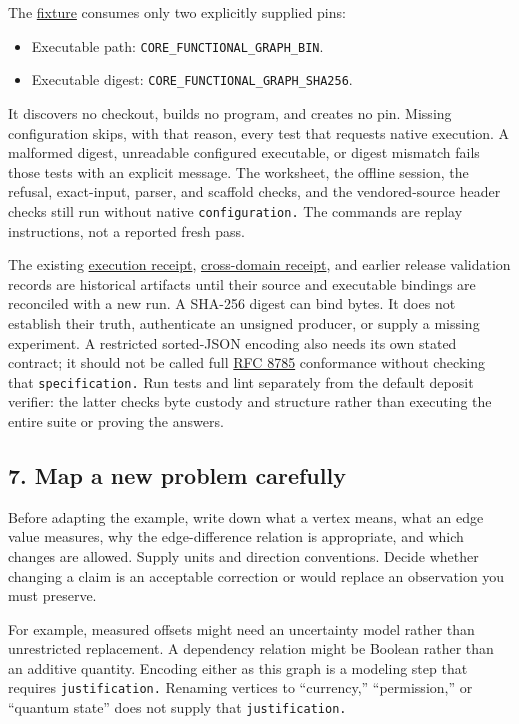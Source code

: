 \documentclass[
  11pt,
]{article}
\providecommand{\tightlist}{%
  \setlength{\itemsep}{0pt}\setlength{\parskip}{0pt}}
\begin{document}
The \href{code/tests/conftest.py}{fixture} consumes only two explicitly
supplied pins:

\begin{itemize}
\tightlist
\item
  Executable path: \nolinkurl{CORE_FUNCTIONAL_GRAPH_BIN}.
\item
  Executable digest: \nolinkurl{CORE_FUNCTIONAL_GRAPH_SHA256}.
\end{itemize}

It discovers no checkout, builds no program, and creates no pin. Missing
configuration skips, with that reason, every test that requests native
execution. A malformed digest, unreadable configured executable, or
digest mismatch fails those tests with an explicit message. The
worksheet, the offline session, the refusal, exact-input, parser, and
scaffold checks, and the vendored-source header checks still run without
native \nolinkurl{configuration.} The commands are replay instructions,
not a reported fresh pass.

The existing \href{code/paper_033_execution_receipt.json}{execution
receipt}, \href{code/cross_domain_symbol_game_receipt.json}{cross-domain
receipt}, and earlier release validation records are historical
artifacts until their source and executable bindings are reconciled with
a new run. A SHA-256 digest can bind bytes. It does not establish their
truth, authenticate an unsigned producer, or supply a missing
experiment. A restricted sorted-JSON encoding also needs its own stated
contract; it should not be called full
\href{https://www.rfc-editor.org/rfc/rfc8785}{RFC 8785} conformance
without checking that \nolinkurl{specification.} Run tests and lint
separately from the default deposit verifier: the latter checks byte
custody and structure rather than executing the entire suite or proving
the answers.

\subsection{7. Map a new problem
carefully}\label{map-a-new-problem-carefully}

Before adapting the example, write down what a vertex means, what an
edge value measures, why the edge-difference relation is appropriate,
and which changes are allowed. Supply units and direction conventions.
Decide whether changing a claim is an acceptable correction or would
replace an observation you must preserve.

For example, measured offsets might need an uncertainty model rather
than unrestricted replacement. A dependency relation might be Boolean
rather than an additive quantity. Encoding either as this graph is a
modeling step that requires \nolinkurl{justification.} Renaming vertices
to ``currency,'' ``permission,'' or ``quantum state'' does not supply
that \nolinkurl{justification.}
\end{document}

